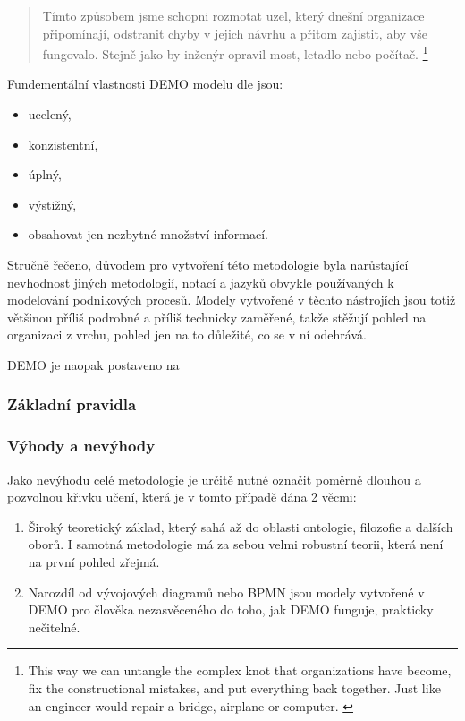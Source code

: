 \documentclass[]{article}
\begin{document}
\begin{quote}
Tímto způsobem jsme schopni rozmotat uzel,  který dnešní organizace připomínají, odstranit chyby v jejich návrhu a přitom zajistit, aby vše fungovalo. Stejně jako by inženýr opravil most, letadlo nebo počítač. \cite{DEMO_web}
\footnote{This way we can untangle the complex knot that organizations have become, fix the constructional mistakes, and put everything back together. Just like an engineer would repair a bridge, airplane or computer. \cite{DEMO_web}}
\end{quote}

Fundementální vlastnosti DEMO modelu dle \cite{Dietz2006} jsou:

\begin{itemize}
\item ucelený,
\item konzistentní,
\item úplný,
\item výstižný,
\item obsahovat jen nezbytné množství informací.
\end{itemize}

Stručně řečeno, důvodem pro vytvoření této metodologie byla narůstající nevhodnost jiných metodologií, notací a jazyků obvykle používaných k modelování podnikových procesů. Modely vytvořené v těchto nástrojích jsou totiž většinou příliš podrobné a příliš technicky zaměřené, takže stěžují pohled na organizaci z vrchu, pohled jen na to důležité, co se v ní odehrává.

DEMO je naopak postaveno na 

\subsubsection{Základní pravidla}

\subsubsection{Výhody a nevýhody}
Jako nevýhodu celé metodologie je určitě nutné označit poměrně dlouhou a pozvolnou křivku učení, která je v tomto případě dána 2 věcmi:

\begin{enumerate}
\item Široký teoretický základ, který sahá až do oblasti ontologie, filozofie a dalších oborů. I samotná metodologie má za sebou velmi robustní teorii, která není na první pohled zřejmá.
\item Narozdíl od vývojových diagramů nebo BPMN jsou modely vytvořené v DEMO pro člověka nezasvěceného do toho, jak DEMO funguje, prakticky nečitelné.
\end{enumerate}
\end{document}
